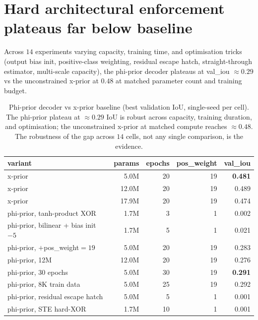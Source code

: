 \documentclass[11pt,a4paper]{article}
\begin{document}
\section{Hard architectural enforcement plateaus far below baseline}
\label{sec:phi-prior}

Across $14$ experiments varying capacity, training time, and
optimisation tricks (output bias init, positive-class weighting,
residual escape hatch, straight-through estimator, multi-scale
capacity), the phi-prior decoder plateaus at val\_iou $\approx 0.29$
vs the unconstrained x-prior at $0.48$ at matched parameter count and
training budget.

\begin{table}[h]
\centering
\small
\begin{tabular}{lrrrr}
\toprule
variant & params & epochs & pos\_weight & val\_iou \\
\midrule
x-prior                                  & 5.0M  & 20 & 19 & \textbf{0.481} \\
x-prior                                  & 12.0M & 20 & 19 & 0.489 \\
x-prior                                  & 17.9M & 20 & 19 & 0.474 \\
\midrule
phi-prior, tanh-product XOR              & 1.7M  &  3 &  1 & 0.002 \\
phi-prior, bilinear + bias init $-5$     & 1.7M  &  5 &  1 & 0.021 \\
phi-prior, $+$pos\_weight$=19$           & 5.0M  & 20 & 19 & 0.283 \\
phi-prior, 12M                           & 12.0M & 20 & 19 & 0.276 \\
phi-prior, 30 epochs                     & 5.0M  & 30 & 19 & \textbf{0.291} \\
phi-prior, 8K train data                 & 5.0M  & 25 & 19 & 0.292 \\
phi-prior, residual escape hatch         & 5.0M  &  5 &  1 & 0.001 \\
phi-prior, STE hard-XOR                  & 1.7M  & 10 &  1 & 0.001 \\
\bottomrule
\end{tabular}
\caption{Phi-prior decoder vs x-prior baseline (best validation IoU,
single-seed per cell). The phi-prior plateau at $\approx 0.29$ IoU is
robust across capacity, training duration, and optimisation; the
unconstrained x-prior at matched compute reaches $\approx 0.48$. The
robustness of the gap across $14$ cells, not any single comparison, is
the evidence.}
\label{tab:phi-prior}
\end{table}
\end{document}
